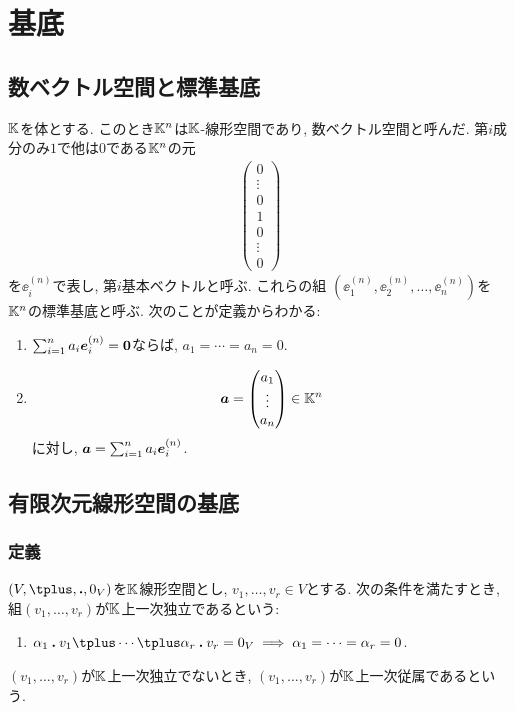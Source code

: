 \chapter{基底}
\section{数ベクトル空間と標準基底}
$\mathbb{K}$を体とする.
このとき$\mathbb{K}^n$は$\mathbb{K}$-線形空間であり,
数ベクトル空間と呼んだ.
第$i$成分のみ$1$で他は$0$である$\mathbb{K}^n$の元
\begin{align*}
  \begin{pmatrix}0\\\vdots\\0\\1\\0\\\vdots\\0\end{pmatrix}
\end{align*}
を$\ee^{(n)}_i$で表し,
第$i$基本ベクトルと呼ぶ.
これらの組 $(\ee^{(n)}_1,\ee^{(n)}_2,\ldots,\ee^{(n)}_n)$を
$\mathbb{K}^n$の標準基底と呼ぶ.
次のことが定義からわかる:
\begin{enumerate}
  \item
    $\sum_{i=1}^na_i\boldsymbol{e}^{(n)}_i=\boldsymbol{0}$ならば, $a_1=\cdots=a_n=0$.
\item
    \begin{align*}
      \boldsymbol{a}=\begin{pmatrix}a_1\\\vdots\\a_n\end{pmatrix}\in\mathbb{K}^n
    \end{align*}
    に対し, $\boldsymbol{a}=\sum_{i=1}^na_i\boldsymbol{e}^{(n)}_i$.
\end{enumerate}


\section{有限次元線形空間の基底}
\subsection{定義}


\begin{definition}
  $(V,\plus,\act,0_V)$を$\mathbb{K}$線形空間とし,
  $v_1,\ldots,v_r\in V$とする.
  次の条件を満たすとき,
  組$(v_1,\ldots,v_r)$が$\mathbb{K}$上一次独立であるという:
  \begin{enumerate}
  \item $\alpha_1\act v_1\plus\cdots\plus \alpha_r\act v_r=0_V \implies \alpha_1=\cdots=\alpha_r=0$.
  \end{enumerate}
  $(v_1,\ldots,v_r)$が$\mathbb{K}$上一次独立でないとき,
  $(v_1,\ldots,v_r)$が$\mathbb{K}$上一次従属であるという.
\end{definition}

